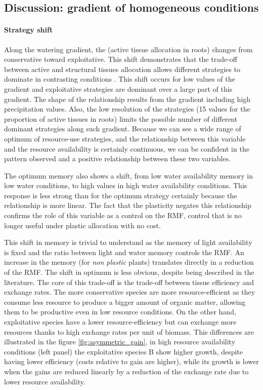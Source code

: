 \subsection{Discussion: gradient of homogeneous conditions}

\paragraph{Strategy shift}
Along the watering gradient, the  (active tissue allocation in roots) changes from conservative toward exploitative. This shift demonstrates that the trade-off between active and structural tissues allocation allows different strategies to dominate in contrasting conditions \parencite{wright_worldwide_2006}. This shift occurs for low values of the gradient and exploitative strategies are dominant over a large part of this gradient. The shape of the relationship results from the gradient including high precipitation values. Also, the low resolution of the strategies (15 values for the proportion of active tissues in roots) limits the possible number of different dominant strategies along such gradient. Because we can see a wide range of optimum of resource-use strategies, and the relationship between this variable and the resource availability is certainly continuous, we can be confident in the pattern observed and a positive relationship between these two variables.

The optimum memory also shows a shift, from low water availability memory in low water conditions, to high values in high water availability conditions. This response is less strong than for the optimum strategy certainly because the relationship is more linear. The fact that the plasticity negates this relationship confirms the role of this variable as a control on the RMF, control that is no longer useful under plastic allocation with no cost.

This shift in memory is trivial to understand as the memory of light availability is fixed and the ratio between light and water memory controls the RMF. An increase in the memory (for \textit{non plastic} plants) translates directly in a reduction of the RMF. The shift in optimum is less obvious, despite being described in the literature. The core of this trade-off is the trade-off between tissue efficiency and exchange rates. The more conservative species are more resource-efficient as they consume less resource to produce a bigger amount of organic matter, allowing them to be productive even in low resource conditions. On the other hand, exploitative species have a lower resource-efficiency but can exchange more resources thanks to high exchange rates per unit of biomass. This differences are illustrated in the figure \ref{fig:asymmetric_gain}, in high resource availability conditions (left panel) the exploitative species B show higher growth, despite having lower efficiency (costs relative to gain are higher), while its growth is lower when the gains are reduced linearly by a reduction of the exchange rate due to lower resource availability. 

